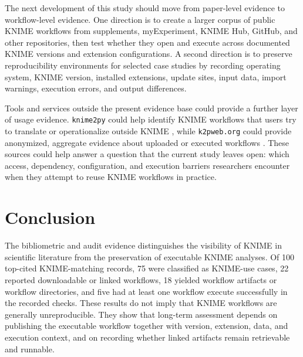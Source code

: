 \documentclass[runningheads]{llncs}
\begin{document}
The next development of this study should move from paper-level evidence to
workflow-level evidence. One direction is to create a larger corpus of public
KNIME workflows from supplements, myExperiment, KNIME Hub, GitHub, and other
repositories, then test whether they open and execute across documented KNIME
versions and extension configurations. A second direction is to preserve
reproducibility environments for selected case studies by recording operating
system, KNIME version, installed
extensions, update sites, input data, import warnings, execution errors, and
output differences.

Tools and services outside the present evidence base could provide a further
layer of usage evidence. \texttt{knime2py} could help identify KNIME workflows
that users try to translate or operationalize outside KNIME
\cite{KaplanKnime2py2026}, while \texttt{k2pweb.org} could provide anonymized,
aggregate evidence about uploaded or executed workflows \cite{K2PWeb2026}.
These sources could help answer a question that the current study leaves open:
which access, dependency, configuration, and execution barriers researchers
encounter when they attempt to reuse KNIME workflows in practice.

\section{Conclusion}

The bibliometric and audit evidence distinguishes the visibility of KNIME in
scientific literature from the preservation of executable KNIME analyses. Of
100 top-cited KNIME-matching records, 75 were classified as KNIME-use cases, 22
reported downloadable or linked workflows, 18 yielded workflow artifacts or
workflow directories, and five had at least one workflow execute successfully
in the recorded checks. These results do not imply that KNIME workflows are
generally unreproducible. They show that long-term assessment depends on
publishing the executable workflow together with version, extension, data, and
execution context, and on recording whether linked artifacts remain retrievable
and runnable.



\end{document}
